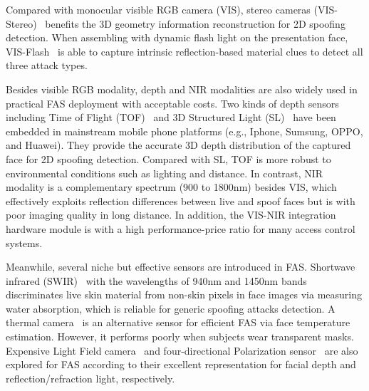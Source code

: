 \documentclass[10pt,journal,compsoc]{IEEEtran}
\begin{document}
Compared with monocular visible RGB camera (VIS), stereo cameras (VIS-Stereo)~\cite{rehman2020slnet} benefits the 3D geometry information reconstruction for 2D spoofing detection. When assembling with dynamic flash light on the presentation face, VIS-Flash~\cite{liu2019AuroraGuard} is able to capture intrinsic reflection-based material clues to detect all three attack types. 


Besides visible RGB modality, depth and NIR modalities are also widely used in practical FAS deployment with acceptable costs. Two kinds of depth sensors including Time of Flight (TOF)~\cite{wu2019review} and 3D Structured Light (SL)~\cite{connell2013fake} have been embedded in mainstream mobile phone platforms (e.g., Iphone, Sumsung, OPPO, and Huawei). They provide the accurate 3D depth distribution of the captured face for 2D spoofing detection. Compared with SL, TOF is more robust to environmental conditions such as lighting and distance. In contrast, NIR~\cite{sun2016context} modality is a complementary spectrum (900 to 1800nm) besides VIS, which effectively exploits reflection differences between live and spoof faces but is with poor imaging quality in long distance. In addition, the VIS-NIR integration hardware module is with a high performance-price ratio for many access control systems. 


Meanwhile, several niche but effective sensors are introduced in FAS. Shortwave infrared (SWIR)~\cite{heusch2020deep} with the wavelengths of 940nm and 1450nm bands discriminates live skin material from non-skin pixels in face images via measuring water absorption, which is reliable for generic spoofing attacks detection. A thermal camera~\cite{seo2019face} is an alternative sensor for efficient FAS via face temperature estimation. However, it performs poorly when subjects wear transparent masks. Expensive Light Field camera~\cite{liu2019light} and four-directional Polarization sensor~\cite{tian2020face} are also explored for FAS according to their excellent representation for facial depth and reflection/refraction light, respectively.   
\end{document}

